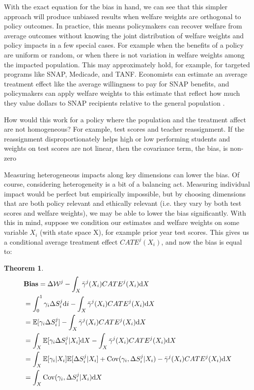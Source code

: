 \documentclass[12pt]{article}
\theoremstyle{definition}
\theoremstyle{definition}
\theoremstyle{definition}
\theoremstyle{definition}
\newtheorem{thm}{Theorem}
\begin{document}
    With the exact equation for the bias in hand, we can see that this simpler approach will produce unbiased results when welfare weights are orthogonal to policy outcomes.   In practice, this means policymakers can recover welfare from average outcomes without knowing the joint distribution of welfare weights and policy impacts in a few special cases.  For example when the benefits of a policy are uniform or random, or when there is not variation in welfare weights among the impacted population. This may approximately hold, for example, for targeted programs like SNAP, Medicade, and TANF. Economists can estimate an average treatment effect like the average willingness to pay for SNAP benefits, and policymakers can apply welfare weights to this estimate that reflect how much they value dollars to SNAP recipients relative to the general population \citep{Keyser_2020}. 
    
    How would this work for a policy where the population and the treatment affect are not homogeneous?  For example, test scores and teacher reassignment. If the reassignment disproportionately helps high or low performing students and weights on test scores are not linear, then the covariance term, the bias, is non-zero

 Measuring heterogeneous impacts along key dimensions can lower the bias. Of course, considering heterogeneity is a bit of a balancing act. Measuring individual impact would be perfect but empirically impossible, but by choosing dimensions that are both policy relevant and ethically relevant (i.e. they vary by both test scores and welfare weights), we may be able to lower the bias significantly. With this in mind, suppose we condition our estimates and welfare weights on some variable $X_i$ (with state space X), for example prior year test scores. This gives us a conditional average treatment effect $CATE^j(X_i)$, and now the bias is equal to:



    \begin{thm}
    \label{cond_exp_1}
        \begin{align*}
       & \textbf{Bias} = \Delta \mathcal{W}^j - \int_X \bar{\gamma}^j(X_i) CATE^j(X_i)\text{d}X  \\
       & =   \int_0^1 \gamma_i \Delta S^j_i \text{d}i - \int_X \bar{\gamma}^j(X_i) CATE^j(X_i) \text{d}X   \\
      & =  \mathbb{E}[\gamma_i \Delta S^j_i] - \int_X \bar{\gamma}^j(X_i) CATE^j(X_i) \text{d}X  \\
        & =  \int_X \mathbb{E}[\gamma_i \Delta S^j_i| X_i]\text{d}X - \int_X \bar{\gamma}^j(X_i) CATE^j(X_i)\text{d}X \\
       & = \int_X   \mathbb{E}[\gamma_i| X_i] \mathbb{E}[\Delta S^j_i| X_i] + \mathrm{Cov}(\gamma_i, \Delta S^j_i| X_i) - \bar{\gamma}^j(X_i) CATE^j(X_i)\text{d}X \\
       & = \int_X \mathrm{Cov}(\gamma_i, \Delta S^j_i| X_i)\text{d}X
    \end{align*}
    \end{thm}
    
\end{document}
